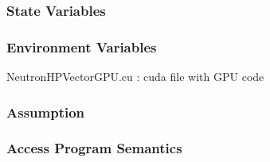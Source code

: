 \documentclass[12pt]{article}
\begin{document}
\subsubsection{State Variables}%

\subsubsection{Environment Variables}%
NeutronHPVectorGPU.cu : cuda file with GPU code

\subsubsection{Assumption}%

\subsubsection{Access Program Semantics}%
\end{document}
